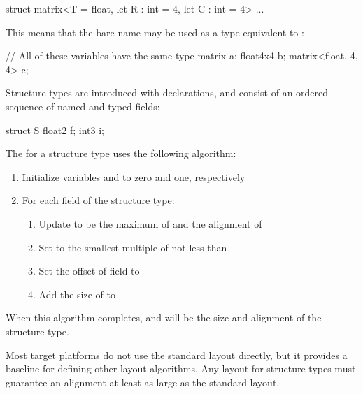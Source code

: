 \begin{codeblock}
struct matrix<T = float, let R : int = 4, let C : int = 4> { ... }
\end{codeblock}

This means that the bare name  may be used as a type equivalent to :

\begin{codeblock}
// All of these variables have the same type
matrix a;
float4x4 b;
matrix<float, 4, 4> c;
\end{codeblock}


Structure types are introduced with  declarations, and consist of an ordered sequence of named and typed fields:

\begin{codeblock}
struct S
{
    float2 f;
    int3 i;
}
\end{codeblock}


The  for a structure type uses the following algorithm:

\begin{enumerate}
  \item{Initialize variables  and  to zero and one, respectively}
  \item{For each field  of the structure type:}
  \begin{enumerate}
    \item {Update  to be the maximum of  and the alignment of }
    \item {Set  to the smallest multiple of  not less than }
    \item {Set the offset of field  to }
    \item {Add the size of  to }
  \end{enumerate}
\end{enumerate}

When this algorithm completes,  and  will be the size and alignment of the structure type.

Most target platforms do not use the standard layout directly, but it provides a baseline for defining other layout algorithms.
Any layout for structure types must guarantee an alignment at least as large as the standard layout.

